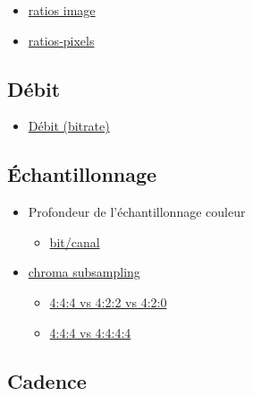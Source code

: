 \documentclass[
]{book}
\providecommand{\tightlist}{%
  \setlength{\itemsep}{0pt}\setlength{\parskip}{0pt}}
\begin{document}
\begin{itemize}
\tightlist
\item
  \href{https://en.wikipedia.org/wiki/Display_aspect_ratio}{ratios image}
\item
  \href{https://en.wikipedia.org/wiki/Pixel_aspect_ratio}{ratios-pixels}
\end{itemize}

\hypertarget{duxe9bit}{%
\subsection{Débit}\label{duxe9bit}}

\begin{itemize}
\tightlist
\item
  \href{https://en.wikipedia.org/wiki/Bit_rate\#Video}{Débit (bitrate)}
\end{itemize}

\hypertarget{uxe9chantillonnage}{%
\subsection{Échantillonnage}\label{uxe9chantillonnage}}

\begin{itemize}
\tightlist
\item
  Profondeur de l'échantillonnage couleur

  \begin{itemize}
  \tightlist
  \item
    \href{https://en.wikipedia.org/wiki/Color_depth}{bit/canal}\\
  \end{itemize}
\item
  \href{https://en.wikipedia.org/wiki/Chroma_subsampling\#Sampling_systems_and_ratios}{chroma subsampling}

  \begin{itemize}
  \tightlist
  \item
    \href{https://upload.wikimedia.org/wikipedia/commons/0/06/Colorcomp.jpg}{4:4:4 vs 4:2:2 vs 4:2:0}
  \item
    \href{https://en.wikipedia.org/wiki/Alpha_compositing}{4:4:4 vs 4:4:4:4}
  \end{itemize}
\end{itemize}

\hypertarget{cadence}{%
\subsection{Cadence}\label{cadence}}
\end{document}
